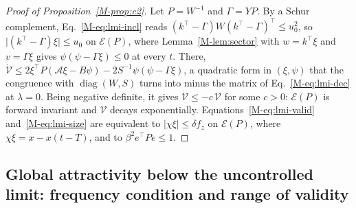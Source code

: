 \begin{proof}[Proof of Proposition~\ref{M-prop:c2}]
Let $P=W^{-1}$ and $\Gamma=YP$. By a Schur complement, Eq.~\eqref{M-eq:lmi-incl} reads $(k^\top-\Gamma)W(k^\top-\Gamma)^\top\le u_0^2$, so $\lvert(k^\top-\Gamma)\xi\rvert\le u_0$ on $\mathcal E(P)$, where Lemma~\ref{M-lem:sector} with $w=k^\top\xi$ and $v=\Gamma\xi$ gives $\psi(\psi-\Gamma\xi)\le0$ at every $t$. There, $\dot{\mathcal V}\le2\xi^\top P(\mathcal A\xi-B\psi)-2S^{-1}\psi(\psi-\Gamma\xi)$, a quadratic form in $(\xi,\psi)$ that the congruence with $\operatorname{diag}(W,S)$ turns into minus the matrix of Eq.~\eqref{M-eq:lmi-dec} at $\lambda=0$. Being negative definite, it gives $\dot{\mathcal V}\le-c\,\mathcal V$ for some $c>0$: $\mathcal E(P)$ is forward invariant and $\mathcal V$ decays exponentially. Equations~\eqref{M-eq:lmi-valid} and~\eqref{M-eq:lmi-size} are equivalent to $\lvert\chi\xi\rvert\le\delta f_z$ on $\mathcal E(P)$, where $\chi\xi=x-x(t-T)$, and to $\beta^2e^\top Pe\le1$.
\end{proof}

\subsection{Global attractivity below the uncontrolled limit: frequency condition and range of validity}\label{supp:std-circle}


